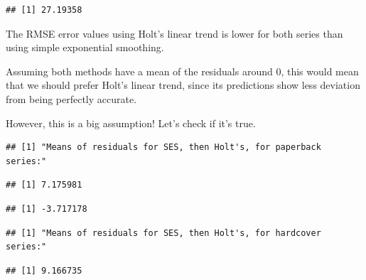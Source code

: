 \documentclass[]{book}
\newenvironment{Shaded}{\begin{snugshade}}{\end{snugshade}}
\newcommand{\KeywordTok}[1]{\textcolor[rgb]{0.13,0.29,0.53}{\textbf{#1}}}
\newcommand{\NormalTok}[1]{#1}
\newcommand{\OperatorTok}[1]{\textcolor[rgb]{0.81,0.36,0.00}{\textbf{#1}}}
\begin{document}
\begin{verbatim}
## [1] 27.19358
\end{verbatim}

The RMSE error values using Holt's linear trend is lower for both series than using simple exponential smoothing.

Assuming both methods have a mean of the residuals around 0, this would mean that we should prefer Holt's linear trend, since its predictions show less deviation from being perfectly accurate.

However, this is a big assumption! Let's check if it's true.

\begin{verbatim}
## [1] "Means of residuals for SES, then Holt's, for paperback series:"
\end{verbatim}

\begin{Shaded}
\end{Shaded}

\begin{verbatim}
## [1] 7.175981
\end{verbatim}

\begin{Shaded}
\end{Shaded}

\begin{verbatim}
## [1] -3.717178
\end{verbatim}

\begin{verbatim}
## [1] "Means of residuals for SES, then Holt's, for hardcover series:"
\end{verbatim}

\begin{Shaded}
\end{Shaded}

\begin{verbatim}
## [1] 9.166735
\end{verbatim}
\end{document}
